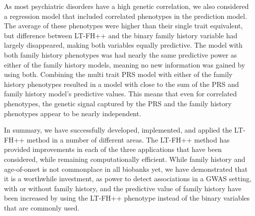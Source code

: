 As most psychiatric disorders have a high genetic correlation, we also considered a regression model that included correlated phenotypes in the prediction model. The average of these phenotypes were higher than their single trait equivalent, but difference between LT-FH++ and the binary family history variable had largely disappeared, making both variables equally predictive. The model with both family history phenotypes was had nearly the same predictive power as either of the family history models, meaning no new information was gained by using both. Combining the multi trait PRS model with either of the family history phenotypes resulted in a model with close to the sum of the PRS and family history model's predictive values. This means that even for correlated phenotypes, the genetic signal captured by the PRS and the family history phenotypes appear to be nearly independent.

In summary, we have successfully developed, implemented, and applied the LT-FH++ method in a number of different areas. The LT-FH++ method has provided improvements in each of the three applications that have been considered, while remaining computationally efficient. While family history and age-of-onset is not commonplace in all biobanks yet, we have demonstrated that it is a worthwhile investment, as power to detect associations in a GWAS setting, with or without family history, and the predictive value of family history have been increased by using the LT-FH++ phenotype instead of the binary variables that are commonly used.

